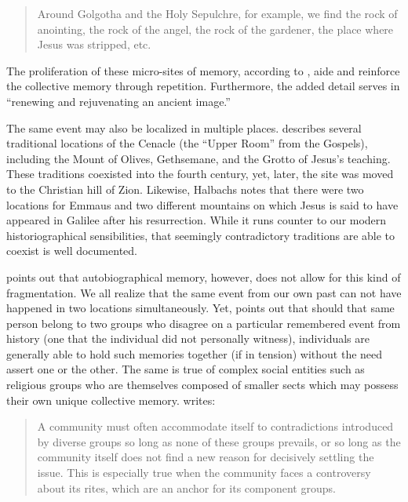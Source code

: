 \begin{quote}
Around Golgotha and the Holy Sepulchre, for example, we find the rock of
anointing, the rock of the angel, the rock of the gardener, the place
where Jesus was stripped, etc.\autocite[220]{halbwachs1992}
\end{quote}

The proliferation of these micro-sites of memory, according to
\halbwachs, aide and reinforce the collective memory
through repetition. Furthermore, the added detail serves in ``renewing
and rejuvenating an ancient image.''\autocite[220]{halbwachs1992}

The same event may also be localized in multiple places.
\halbwachs describes several traditional locations of
the Cenacle (the ``Upper Room'' from the Gospels), including the Mount
of Olives, Gethsemane, and the Grotto of Jesus's teaching. These
traditions coexisted into the fourth century, yet, later, the site was
moved to the Christian hill of Zion. Likewise, Halbachs notes that there
were two locations for Emmaus and two different mountains on which Jesus
is said to have appeared in Galilee after his resurrection. While it
runs counter to our modern historiographical sensibilities, that
seemingly contradictory traditions are able to coexist is well
documented.

\halbwachs points out that autobiographical memory,
however, does not allow for this kind of fragmentation. We all realize
that the same event from our own past can not have happened in two
locations simultaneously. Yet, \halbwachs points out
that should that same person belong to two groups who disagree on a
particular remembered event from history (one that the individual did
not personally witness), individuals are generally able to hold such
memories together (if in tension) without the need assert one or the
other. The same is true of complex social entities such as religious
groups who are themselves composed of smaller sects which may possess
their own unique collective memory. \halbwachs writes:

\begin{quote}
A community must often accommodate itself to contradictions introduced
by diverse groups so long as none of these groups prevails, or so long
as the community itself does not find a new reason for decisively
settling the issue. This is especially true when the community faces a
controversy about its rites, which are an anchor for its component
groups.\autocite[224]{halbwachs1992}
\end{quote}

